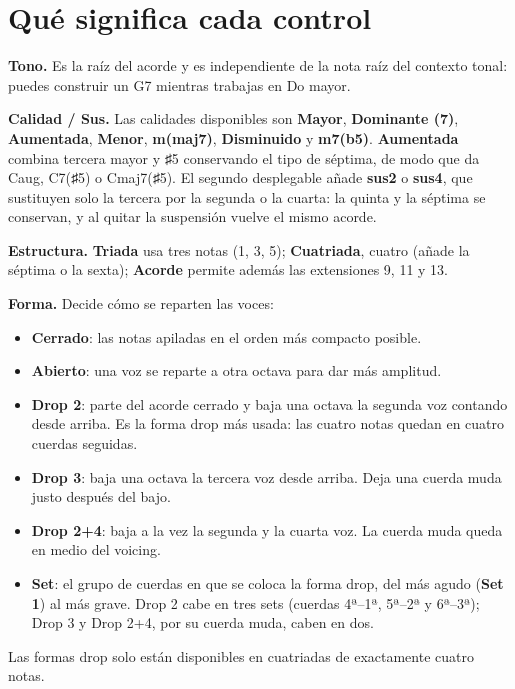 \documentclass[a4paper,11pt,oneside]{report}
\providecommand{\tightlist}{\setlength{\itemsep}{2pt}\setlength{\parskip}{0pt}}
\begin{document}
\Needspace{3.5cm}
\section{Qué significa cada control}\label{quuxe9-significa-cada-control}

\textbf{Tono.} Es la raíz del acorde y es independiente de la nota raíz del contexto tonal: puedes construir un G7 mientras trabajas en Do mayor.

\textbf{Calidad / Sus.} Las calidades disponibles son \textbf{Mayor}, \textbf{Dominante (7)}, \textbf{Aumentada}, \textbf{Menor}, \textbf{m(maj7)}, \textbf{Disminuido} y \textbf{m7(b5)}. \textbf{Aumentada} combina tercera mayor y ♯5 conservando el tipo de séptima, de modo que da Caug, C7(♯5) o Cmaj7(♯5). El segundo desplegable añade \textbf{sus2} o \textbf{sus4}, que sustituyen solo la tercera por la segunda o la cuarta: la quinta y la séptima se conservan, y al quitar la suspensión vuelve el mismo acorde.

\textbf{Estructura.} \textbf{Triada} usa tres notas (1, 3, 5); \textbf{Cuatriada}, cuatro (añade la séptima o la sexta); \textbf{Acorde} permite además las extensiones 9, 11 y 13.

\textbf{Forma.} Decide cómo se reparten las voces:

\begin{itemize}
\tightlist
\item
  \textbf{Cerrado}: las notas apiladas en el orden más compacto posible.
\item
  \textbf{Abierto}: una voz se reparte a otra octava para dar más amplitud.
\item
  \textbf{Drop 2}: parte del acorde cerrado y baja una octava la segunda voz contando desde arriba. Es la forma drop más usada: las cuatro notas quedan en cuatro cuerdas seguidas.
\item
  \textbf{Drop 3}: baja una octava la tercera voz desde arriba. Deja una cuerda muda justo después del bajo.
\item
  \textbf{Drop 2+4}: baja a la vez la segunda y la cuarta voz. La cuerda muda queda en medio del voicing.
\item
  \textbf{Set}: el grupo de cuerdas en que se coloca la forma drop, del más agudo (\textbf{Set 1}) al más grave. Drop 2 cabe en tres sets (cuerdas 4ª--1ª, 5ª--2ª y 6ª--3ª); Drop 3 y Drop 2+4, por su cuerda muda, caben en dos.
\end{itemize}

Las formas drop solo están disponibles en cuatriadas de exactamente cuatro notas.
\end{document}
